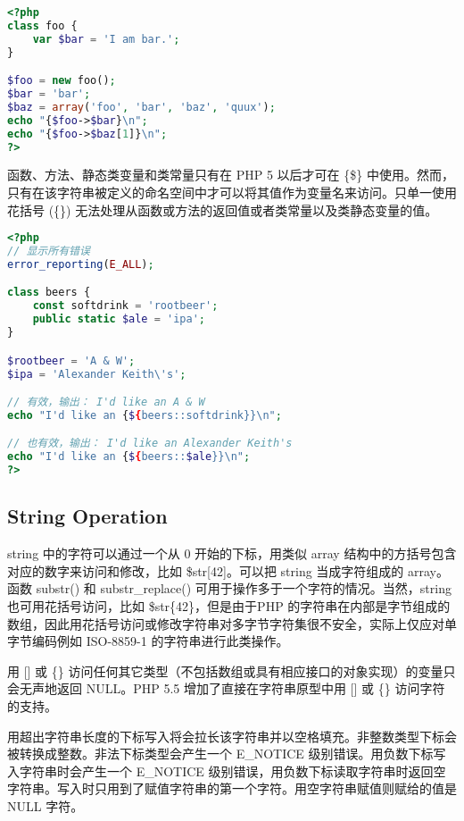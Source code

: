 \begin{compactitem}
\begin{lstlisting}[language=PHP]
<?php
class foo {
    var $bar = 'I am bar.';
}

$foo = new foo();
$bar = 'bar';
$baz = array('foo', 'bar', 'baz', 'quux');
echo "{$foo->$bar}\n";
echo "{$foo->$baz[1]}\n";
?>
\end{lstlisting}

函数、方法、静态类变量和类常量只有在 PHP 5 以后才可在 \{\$\} 中使用。然而，只有在该字符串被定义的命名空间中才可以将其值作为变量名来访问。只单一使用花括号 (\{\}) 无法处理从函数或方法的返回值或者类常量以及类静态变量的值。

\begin{lstlisting}[language=PHP]
<?php
// 显示所有错误
error_reporting(E_ALL);

class beers {
    const softdrink = 'rootbeer';
    public static $ale = 'ipa';
}

$rootbeer = 'A & W';
$ipa = 'Alexander Keith\'s';

// 有效，输出： I'd like an A & W
echo "I'd like an {${beers::softdrink}}\n";

// 也有效，输出： I'd like an Alexander Keith's
echo "I'd like an {${beers::$ale}}\n";
?>
\end{lstlisting}

\end{compactitem}


\subsection{String Operation}


string 中的字符可以通过一个从 0 开始的下标，用类似 array 结构中的方括号包含对应的数字来访问和修改，比如 \$str[42]。可以把 string 当成字符组成的 array。函数 substr() 和 substr\_replace() 可用于操作多于一个字符的情况。当然，string 也可用花括号访问，比如 \$str\{42\}，但是由于PHP 的字符串在内部是字节组成的数组，因此用花括号访问或修改字符串对多字节字符集很不安全，实际上仅应对单字节编码例如 ISO-8859-1 的字符串进行此类操作。

用 [\/] 或 \{\} 访问任何其它类型（不包括数组或具有相应接口的对象实现）的变量只会无声地返回 NULL。PHP 5.5 增加了直接在字符串原型中用 [\/] 或 \{\} 访问字符的支持。

用超出字符串长度的下标写入将会拉长该字符串并以空格填充。非整数类型下标会被转换成整数。非法下标类型会产生一个 E\_NOTICE 级别错误。用负数下标写入字符串时会产生一个 E\_NOTICE 级别错误，用负数下标读取字符串时返回空字符串。写入时只用到了赋值字符串的第一个字符。用空字符串赋值则赋给的值是 NULL 字符。

